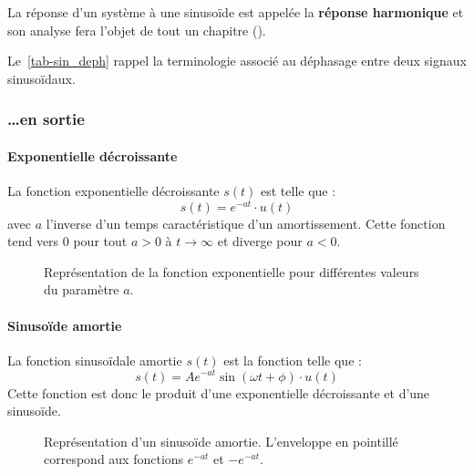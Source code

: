 La réponse d'un système à une sinuso\"ide est appelée la 
\textbf{réponse harmonique} et son analyse fera l'objet de tout 
un chapitre ().

Le~\cref{tab-sin_deph} rappel la terminologie associé au déphasage entre 
deux signaux sinuso\"idaux. 

\clearpage
\subsubsection{\ldots en sortie}

\paragraph{Exponentielle décroissante}
La fonction exponentielle décroissante $s(t)$ est telle que :
$$
s(t)=e^{-at}\cdot u(t)
$$  
avec $a$ l'inverse d'un temps caractéristique d'un amortissement.
Cette fonction tend vers 0 pour tout $a>0$ à $t\rightarrow\infty$ et 
diverge pour $a<0$.
\begin{figure}[!h]
\begin{center}

\end{center}
    \caption{Représentation de la fonction exponentielle pour 
             différentes valeurs du paramètre $a$.\label{fig-exp}}
\end{figure}


\paragraph{Sinuso\"ide amortie}
La fonction sinuso\"idale amortie $s(t)$ est la fonction telle que :
$$
s(t)=Ae^{-at}\sin{(\omega t +\phi)}\cdot u(t)
$$
Cette fonction est donc le produit d'une exponentielle décroissante et 
d'une sinuso\"ide.
\begin{figure}[!h]
\begin{center}

\end{center}
    \caption{Représentation d'un sinuso\"ide amortie. L'enveloppe en pointillé 
correspond aux fonctions $e^{-at}$ et $-e^{-at}$.\label{fig-sin_amor}}
\end{figure}


